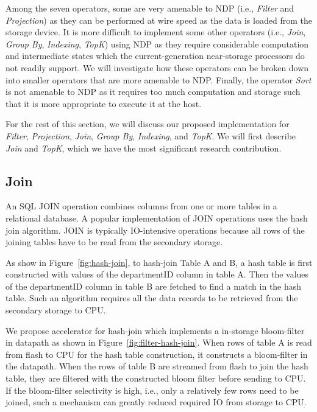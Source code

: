 \documentclass{article}
\newcommand{\filter}{\textit{Filter}\xspace}
\newcommand{\projection}{\textit{Projection}\xspace}
\newcommand{\join}{\textit{Join}\xspace}
\newcommand{\sort}{\textit{Sort}\xspace}
\newcommand{\indexing}{\textit{Indexing}\xspace}
\newcommand{\groupby}{\textit{Group By}\xspace}
\newcommand{\topk}{\textit{TopK}\xspace}
\begin{document}
Among the seven operators, some are very amenable to NDP (i.e., \filter and \projection) as they can be performed at wire speed as the data is loaded from the storage device. It is more difficult to implement some other operators (i.e., \join, \groupby, \indexing, \topk) using NDP as they require considerable computation and intermediate states which the current-generation near-storage processors do not readily support. We will investigate how these operators can be broken down into smaller operators that are more amenable to NDP. 
Finally, the operator \sort is not amenable to NDP as it requires too much computation and storage such that it is more appropriate to execute it at the host. 

For the rest of this section, we will discuss our proposed implementation for \filter, \projection, \join, \groupby, \indexing, and \topk. We will first describe \join and \topk, which we have the most significant research contribution.


\subsection{Join}
\label{sec:join}

An SQL JOIN operation combines columns from one or more tables in a relational database.
A popular implementation of JOIN operations uses the hash join algorithm.
JOIN is typically IO-intensive operations because all rows of the joining tables have to be read from the secondary storage.

As show in Figure~\ref{fig:hash-join}, to hash-join Table A and B, a hash table is first constructed with values of the departmentID column in table A.
Then the values of the departmentID column in table B are fetched to find a match in the hash table.
Such an algorithm requires all the data records to be retrieved from the secondary storage to CPU.

We propose accelerator for hash-join which implements a in-storage bloom-filter in datapath as shown in Figure~\ref{fig:filter-hash-join}.
When rows of table A is read from flash to CPU for the hash table construction, it constructs a bloom-filter in the datapath.
When the rows of table B are streamed from flash to join the hash table, they are filtered with the constructed bloom filter before sending to CPU.
If the bloom-filter selectivity is high, i.e., only a relatively few rows need to be joined, such a mechanism can greatly reduced required IO from storage to CPU.
\end{document}
